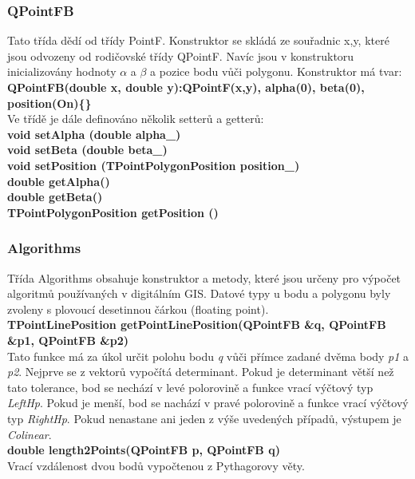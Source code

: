 \documentclass[a4paper,11pt,twoside]{article}
\begin{document}
\subsubsection{QPointFB}
Tato třída dědí od třídy PointF. Konstruktor se skládá ze souřadnic x,y, které jsou odvozeny od rodičovské třídy QPointF. Navíc jsou v konstruktoru inicializovány hodnoty $\alpha$ a $\beta$ a pozice bodu vůči polygonu.
\noindent Konstruktor má tvar:\\
\noindent\textbf{QPointFB(double x, double y):QPointF(x,y), alpha(0), beta(0), position(On)\{\}}\\

\noindent Ve třídě je dále definováno několik setterů a getterů:\\
\noindent\textbf{void setAlpha (double alpha\_)}\\
\noindent\textbf{void setBeta (double beta\_)}\\
\noindent\textbf{void setPosition (TPointPolygonPosition position\_)}\\
\noindent\textbf{double getAlpha()}\\
\noindent\textbf{double getBeta()}\\
\noindent\textbf{TPointPolygonPosition getPosition ()}

\newpage
\vspace*{-1cm}
\subsubsection{Algorithms}
Třída Algorithms obsahuje konstruktor a metody, které jsou určeny pro výpočet algoritmů používaných v digitálním GIS. Datové typy u bodu a polygonu byly zvoleny s plovoucí desetinnou čárkou (floating point).\\

\noindent\textbf{TPointLinePosition getPointLinePosition(QPointFB \&q, QPointFB \&p1, QPointFB \&p2)}\\
Tato funkce má za úkol určit polohu bodu \textit{q} vůči přímce zadané dvěma body \textit{p1} a \textit{p2}.  Nejprve se z vektorů vypočítá determinant. Pokud je determinant větší než tato tolerance, bod se nechází v levé polorovině a funkce vrací výčtový typ \textit{LeftHp}. Pokud je menší, bod se nachází v pravé polorovině a funkce vrací výčtový typ \textit{RightHp}.  Pokud nenastane ani jeden z výše uvedených případů, výstupem je \textit{Colinear}.\\

\noindent\textbf{double length2Points(QPointFB p, QPointFB q)}\\
Vrací vzdálenost dvou bodů vypočtenou z Pythagorovy věty.\\
\end{document}

